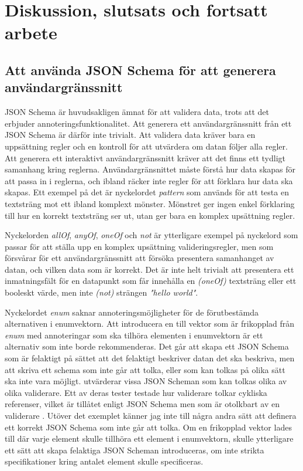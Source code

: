 \chapter{Diskussion, slutsats och fortsatt arbete}
\label{sec:slutsats}
%
%


\section{Att använda JSON Schema för att generera användargränssnitt}

JSON Schema är huvudsakligen ämnat för att validera data, trots att det erbjuder annoteringsfunktionalitet. Att generera ett användargränssnitt från ett JSON Schema är därför inte trivialt. Att validera data kräver bara en uppsättning regler och en kontroll för att utvärdera om datan följer alla regler. Att generera ett interaktivt användargränssnitt kräver att det finns ett tydligt samanhang kring reglerna. Användargränsnittet måste förstå hur data skapas för att passa in i reglerna, och ibland räcker inte regler för att förklara hur data ska skapas. Ett exempel på det är nyckelordet \textit{pattern} som används för att testa en textsträng mot ett ibland komplext mönster. Mönstret ger ingen enkel förklaring till hur en korrekt textsträng ser ut, utan ger bara en komplex upsättning regler.

Nyckelorden \textit{allOf}, \textit{anyOf}, \textit{oneOf} och \textit{not} är ytterligare exempel på nyckelord som passar för att ställa upp en komplex upsättning valideringsregler, men som försvårar för ett användargränssnitt att försöka presentera samanhanget av datan, och vilken data som är korrekt. Det är inte helt trivialt att presentera ett inmatningsfält för en datapunkt som får innehålla en \textit{(oneOf)} textsträng eller ett booleskt värde, men inte \textit{(not)} strängen \textit{"hello world"}.

Nyckelordet \textit{enum} saknar annoteringsmöjligheter för de förutbestämda alternativen i enumvektorn. Att introducera en till vektor som är frikopplad från \textit{enum} med annoteringar som ska tilhöra elementen i enumvektorn är ett alternativ som inte borde rekommenderas. Det går att skapa ett JSON Schema som är felaktigt på sättet att det felaktigt beskriver datan det ska beskriva, men att skriva ett schema som inte går att tolka, eller som kan tolkas på olika sätt ska inte vara möjligt. \citeauthor{Pezoa2016} utvärderar vissa JSON Scheman som kan tolkas olika av olika validerare. Ett av deras tester testade hur validerare tolkar cykliska referenser, vilket är tillåtet enligt JSON Schema men som är otolkbart av en validerare \cite{Pezoa2016}. Utöver det exemplet känner jag inte till några andra sätt att definera ett korrekt JSON Schema som inte går att tolka. Om en frikopplad vektor lades till där varje element skulle tillhöra ett element i enumvektorn, skulle ytterligare ett sätt att skapa felaktiga JSON Scheman introduceras, om inte strikta specifikationer kring antalet element skulle specificeras.

